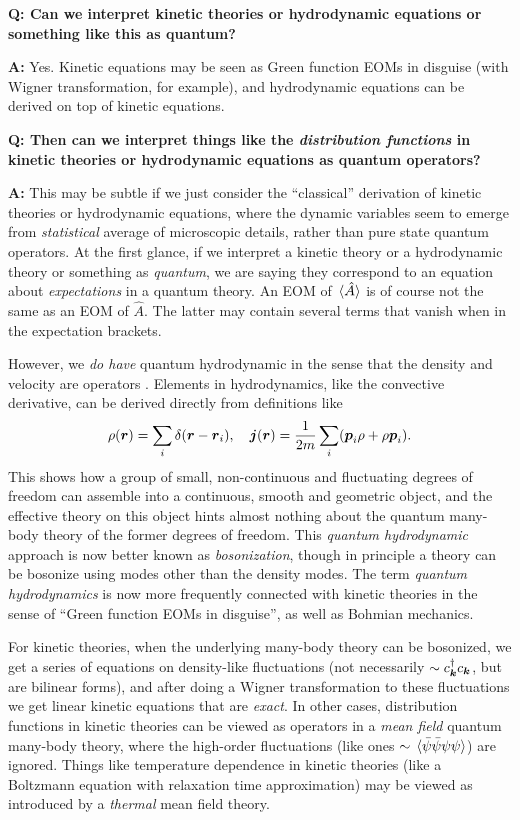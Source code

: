 \documentclass[hyperref, a4paper]{article}
\newenvironment{qanda}{\setlength{\parindent}{0pt}}{\bigskip}
\newcommand{\Q}{\bigskip\bfseries Q: }
\newcommand{\A}{\par\textbf{A:} \normalfont}
\begin{document}
\begin{qanda}

\Q Can we interpret kinetic theories or hydrodynamic equations or something like this as quantum?  
\A Yes. Kinetic equations may be seen as Green function EOMs in disguise (with Wigner transformation, 
for example), and hydrodynamic equations can be derived on top of kinetic equations.

\Q Then can we interpret things like the \emph{distribution functions} in kinetic theories or hydrodynamic equations 
as quantum operators?
\A This may be subtle if we just consider the ``classical'' derivation of kinetic theories or 
hydrodynamic equations, where the dynamic variables seem to emerge from \emph{statistical} average 
of microscopic details, rather than pure state quantum operators. At the first glance, if we interpret
a kinetic theory or a hydrodynamic theory or something as \emph{quantum}, we are saying they correspond 
to an equation about \emph{expectations} in a quantum theory. An EOM of $\expval*{\hat{A}}$ is of course 
not the same as an EOM of $\hat{A}$. The latter may contain several terms that vanish when in the expectation 
brackets.

However, we \emph{do have} quantum hydrodynamic in the sense that the density and velocity are operators \cite{Penrose1954-zv}. Elements in hydrodynamics, like the convective derivative,
can be derived directly from definitions like 
\begin{equation}
    \rho(\vb*{r}) = \sum_i \delta(\vb*{r} - \vb*{r}_i), \quad 
    \vb*{j}(\vb*{r}) = \frac{1}{2m} \sum_i (\vb*{p}_i \rho + \rho \vb*{p}_i).
\end{equation} 
This shows how a group of small, non-continuous and fluctuating degrees of freedom can assemble into 
a continuous, smooth and geometric object, and the effective theory on this object hints almost nothing 
about the quantum many-body theory of the former degrees of freedom. This \emph{quantum hydrodynamic}
approach is now better known as \emph{bosonization}, though in principle a theory can be bosonize using 
modes other than the density modes. The term \emph{quantum hydrodynamics} is now more frequently connected
with kinetic theories in the sense of ``Green function EOMs in disguise'', as well as Bohmian mechanics.

For kinetic theories, when the underlying many-body theory can be bosonized, we get a series of equations  
on density-like fluctuations (not necessarily $\sim c_{\vb*{k}}^\dagger c_{\vb*{k}}$, but are bilinear forms), 
and after doing a Wigner transformation to these fluctuations we get linear kinetic equations that are \emph{exact}.
In other cases, distribution functions in kinetic theories can be viewed as operators in a \emph{mean field} 
quantum many-body theory, where the high-order fluctuations (like ones 
$\sim \expval*{\bar{\psi} \bar{\psi} \psi \psi}$) are ignored. Things like temperature dependence in kinetic 
theories (like a Boltzmann equation with relaxation time approximation) may be viewed as introduced by 
a \emph{thermal} mean field theory.


\end{qanda}
\end{document}
